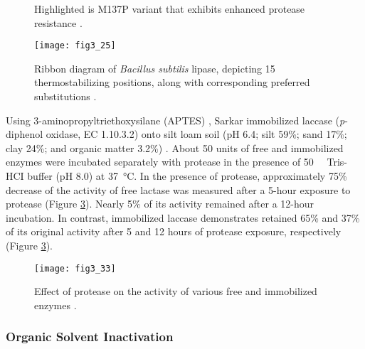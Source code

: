 \begin{refsection}
\begin{figure}[htbp]
{            Highlighted is M137P variant that exhibits enhanced protease
            resistance \cite{Ahmad2012}.}
    \label{fig:protease-resistance}
\end{figure}
\begin{figure}[htbp] \centering \texttt{[image: fig3\_25]}
    \caption[Ribbon diagram of \emph{Bacillus subtilis} lipase, depicting 15
    thermostabilizing positions, along with corresponding preferred
substitutions.] {Ribbon diagram of 
    \emph{Bacillus subtilis} lipase, depicting 15 thermostabilizing positions,
    along with corresponding preferred substitutions \cite{Ahmad2012}.}
    \label{fig:lipase}
\end{figure}

Using 3-aminopropyltriethoxysilane (APTES) , Sarkar 
immobilized laccase (\emph{p}-diphenol oxidase, EC 1.10.3.2) onto silt loam
soil (pH 6.4; silt 59\%; sand 17\%; clay 24\%; and organic matter 3.2\%)
\cite{Sarkar1989,Vashist2014}. About 50 units of free and immobilized enzymes
were incubated separately with protease in the presence of
\SI{50}{\milli\Molar} Tris-HCI buffer (pH 8.0) at \SI{37}{\celsius}. In the
presence of protease, approximately 75\% decrease of the activity of free
lactase was measured after a 5-hour exposure to protease (Figure
\ref{fig:clay}). Nearly 5\% of its activity remained after a 12-hour
incubation.  In contrast, immobilized laccase demonstrates retained 65\% and
37\% of its original activity after 5 and 12 hours of protease exposure,
respectively (Figure \ref{fig:clay}).
\begin{figure}[htbp] \centering \texttt{[image: fig3\_33]}
    \caption[Effect of protease on the activity of various free and immobilized
    enzymes.]{Effect of protease on the activity of various free and immobilized
        enzymes \cite{Sarkar1989}.} \label{fig:clay}
\end{figure}

\subsubsection{Organic Solvent Inactivation}
\label{sec:osi}


\end{refsection}
